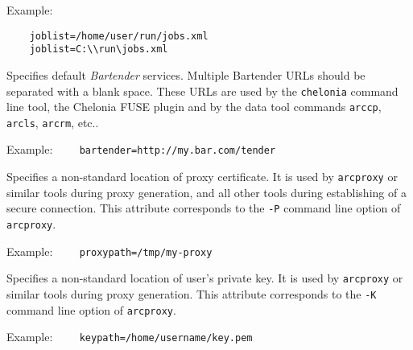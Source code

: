 Example:
\begin{verbatim}
    joblist=/home/user/run/jobs.xml
    joblist=C:\\run\jobs.xml
\end{verbatim}

{}
\hspace*{0.5cm}
\begin{shaded}
\end{shaded}

Specifies default \textit{Bartender} services. Multiple Bartender URLs should
be separated with a blank space.
These URLs are used by the \texttt{chelonia} command line tool, the Chelonia
FUSE plugin and by the data tool commands \texttt{arccp}, \texttt{arcls}, \texttt{arcrm}, etc..

Example:
\verb#    bartender=http://my.bar.com/tender#

{}
\hspace*{0.5cm}
\begin{shaded}
\end{shaded}

Specifies a non-standard location of proxy certificate. It is used by
\texttt{arcproxy} or similar tools during proxy generation, and all other tools
during establishing of a secure connection. This attribute
corresponds to the \verb#-P# command line option of \texttt{arcproxy}.

Example:
\verb#    proxypath=/tmp/my-proxy#

{}
\hspace*{0.5cm}
\begin{shaded}
\end{shaded}

Specifies a non-standard location of user's private key. It is used by
\texttt{arcproxy} or similar tools during proxy generation. This attribute
corresponds to the \verb#-K# command line option of \texttt{arcproxy}.

Example:
\verb#    keypath=/home/username/key.pem#

{}
\hspace*{0.5cm}
\begin{shaded}
\end{shaded}

